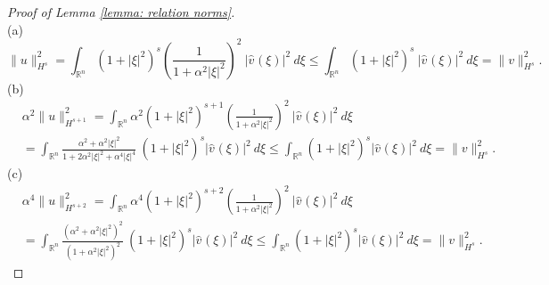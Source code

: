 \documentclass[10pt,a4paper]{amsart}
\begin{document}
 \begin{proof}[Proof of Lemma \ref{lemma: relation norms}]\ \\
 (a)
$$\|u\|_{H^s}^2 =  \int_{\mathbb{R}^n} (1+|\xi|^2)^{s}\left(\frac{1}{1+\alpha^2|\xi|^2}\right)^2\ |\hat{v}^{}(\xi)|^2 \ d\xi \leq  \int_{\mathbb{R}^n} (1+|\xi|^2)^{s} \ |\hat{v}^{}(\xi)|^2 \ d\xi = \|v\|_{H^s}^2. $$
(b)
\begin{equation*}
\begin{aligned}
&\alpha^2\|u\|_{H^{s+1}}^2  = \int_{\mathbb{R}^n} \alpha^2(1+|\xi|^2)^{s+1}\left(\frac{1}{1+\alpha^2|\xi|^2}\right)^2\ |\hat{v}^{}(\xi)|^2 \ d\xi \\
&=    \int_{\mathbb{R}^n} \frac{\alpha^2+ \alpha^2|\xi|^2}{1+2\alpha^2|\xi|^2 + \alpha^4|\xi|^4}\ (1+|\xi|^2)^{s} |\hat{v}^{}(\xi)|^2 \ d\xi \leq \int_{\mathbb{R}^n}  (1+|\xi|^2)^{s} |\hat{v}^{}(\xi)|^2 \ d\xi = \|v\|_{H^s}^2.
\end{aligned}
\end{equation*}
(c)
\begin{equation*}
\begin{aligned}
&\alpha^4\|u\|_{H^{s+2}}^2 = \int_{\mathbb{R}^n} \alpha^4(1+|\xi|^2)^{s+2}\left(\frac{1}{1+\alpha^2|\xi|^2}\right)^2\ |\hat{v}^{}(\xi)|^2 \ d\xi \\
&=  \int_{\mathbb{R}^n} \frac{(\alpha^2+ \alpha^2|\xi|^2)^2}{(1+\alpha^2|\xi|^2)^2}\ (1+|\xi|^2)^{s} |\hat{v}^{}(\xi)|^2 \ d\xi \leq \int_{\mathbb{R}^n}  (1+|\xi|^2)^{s} |\hat{v}^{}(\xi)|^2 \ d\xi = \|v\|_{H^s}^2.
\end{aligned}
\end{equation*}
\end{proof}
\end{document}
